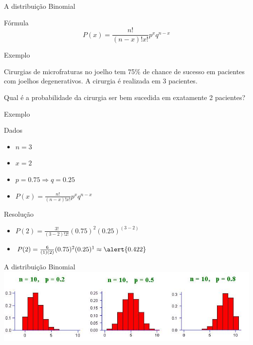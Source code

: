 \documentclass{beamer}
\begin{document}
\begin{frame}{A distribuição Binomial}
  \begin{block}{Fórmula}
    \begin{displaymath}
      P(x) = \frac{n!}{(n-x)!x!}p^x q^{n-x}
    \end{displaymath}
  \end{block}
\end{frame}

\begin{frame}{Exemplo}
  \begin{example}
    Cirurgias de microfraturas no joelho tem 75\% de chance de sucesso em pacientes com joelhos degenerativos.
    A cirurgia é realizada em 3 pacientes.

    \bigskip
    Qual é a probabilidade da cirurgia ser bem sucedida em exatamente 2 pacientes?
  \end{example}
\end{frame}

\begin{frame}{Exemplo}
  \begin{block}{Dados}
    \begin{itemize}
    \item $n = 3$
    \item $x = 2$
    \item $p = 0.75 \Rightarrow q = 0.25$
    \item $P(x) = \frac{n!}{(n-x)!x!}p^x q^{n-x}$
    \end{itemize}
  \end{block}
  \begin{block}{Resolução}
    \begin{itemize}
    \item $P(2) = \frac{3!}{(3-2)!2!}(0.75)^{2} (0.25)^{(3-2)}$
    \item $P(2) = \frac{6}{(1)(2)}(0.75)^{2} (0.25)^{1} \approx \alert{0.422}$
    \end{itemize}
  \end{block}
\end{frame}

\begin{frame}{A distribuição Binomial}
\includegraphics[width=\textwidth]{Prob_II/binomial}
\end{frame}
\end{document}
